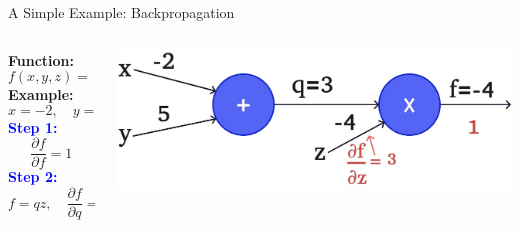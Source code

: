 \documentclass[serif, aspectratio=169]{beamer}
\begin{document}
\begin{frame}{A Simple Example: Backpropagation}

    \begin{columns}
       
        \begin{column}{0.3\textwidth}
            \vspace{-0.4cm}
            \textbf{Function:} 
            \[
            f(x, y, z) = (x + y)z
            \]
            \textbf{Example:} 
            \[
            x = -2, \quad y = 5, \quad z = -4
            \]
             \vspace{-0.4cm}
            \textcolor{blue}{\textbf{Step 1:}}
            \[
            \frac{\partial f}{\partial f} = 1
            \]
             \vspace{-0.4cm}
            \textcolor{blue}{\textbf{Step 2:}}
            \[
            f = qz, \quad
            \frac{\partial f}{\partial q} = z = -4, \quad \frac{\partial f}{\partial z} = q = 3
            \]
        \end{column}

        \begin{column}{0.7\textwidth}
                    \begin{center}
                \includegraphics[width=\textwidth, keepaspectratio]{pic/b4.jpg}
            \end{center}
        \end{column}

    \end{columns}

\end{frame}
\end{document}
